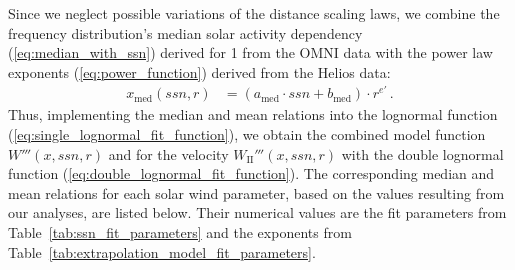 \documentclass[]{aa}
\begin{document}
	Since we neglect possible variations of the distance scaling laws, we combine the frequency distribution’s median solar activity dependency (\ref{eq:median_with_ssn}) derived for \SI{1}{\au} from the OMNI data with the power law exponents (\ref{eq:power_function}) derived from the Helios data:
	\begin{align}
		x_\text{med}(ssn,r) &= \left(a_\text{med} \cdot ssn + b_\text{med}\right) \cdot r^{e'}	\,.	\label{eq:general_sw_model}
	\end{align}
	Thus, implementing the median and mean relations into the lognormal function (\ref{eq:single_lognormal_fit_function}), we obtain the combined model function $W'''(x,ssn,r)$ and for the velocity $W_\text{II}'''(x,ssn,r)$ with the double lognormal function (\ref{eq:double_lognormal_fit_function}). The corresponding median and mean relations for each solar wind parameter, based on the values resulting from our analyses, are listed below. Their numerical values are the fit parameters from Table~\ref{tab:ssn_fit_parameters} and the exponents from Table~\ref{tab:extrapolation_model_fit_parameters}.
\end{document}
